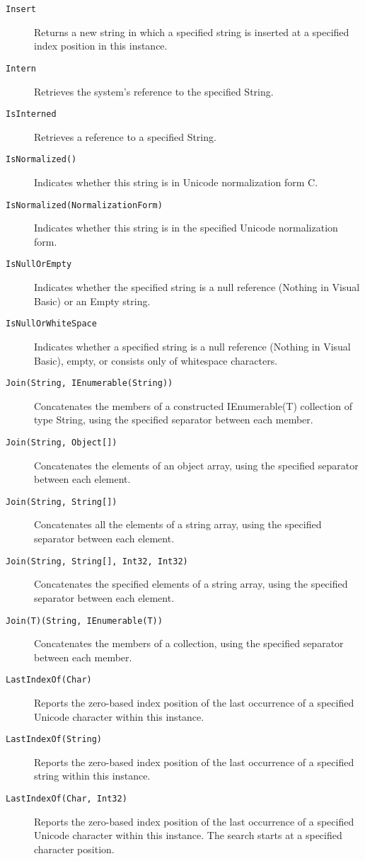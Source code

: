 \begin{description}
\item[\texttt{Insert}] Returns a new string in which a specified string is inserted at a specified index position in this instance.
\item[\texttt{Intern}] Retrieves the system's reference to the specified String.
\item[\texttt{IsInterned}] Retrieves a reference to a specified String.
\item[\texttt{IsNormalized()}] Indicates whether this string is in Unicode normalization form C.
\item[\texttt{IsNormalized(NormalizationForm)}] Indicates whether this string is in the specified Unicode normalization form.
\item[\texttt{IsNullOrEmpty}] Indicates whether the specified string is a null reference (Nothing in Visual Basic) or an Empty string.
\item[\texttt{IsNullOrWhiteSpace}] Indicates whether a specified string is a null reference (Nothing in Visual Basic), empty, or consists only of whitespace characters.
\item[\texttt{Join(String, IEnumerable(String))}] Concatenates the members of a constructed IEnumerable(T) collection of type String, using the specified separator between each member.
\item[\texttt{Join(String, Object[])}] Concatenates the elements of an object array, using the specified separator between each element.
\item[\texttt{Join(String, String[])}] Concatenates all the elements of a string array, using the specified separator between each element.
\item[\texttt{Join(String, String[], Int32, Int32)}] Concatenates the specified elements of a string array, using the specified separator between each element.
\item[\texttt{Join(T)(String, IEnumerable(T))}] Concatenates the members of a collection, using the specified separator between each member.
\item[\texttt{LastIndexOf(Char)}] Reports the zero-based index position of the last occurrence of a specified Unicode character within this instance.
\item[\texttt{LastIndexOf(String)}] Reports the zero-based index position of the last occurrence of a specified string within this instance.
\item[\texttt{LastIndexOf(Char, Int32)}] Reports the zero-based index position of the last occurrence of a specified Unicode character within this instance. The search starts at a specified character position.

\end{description}
